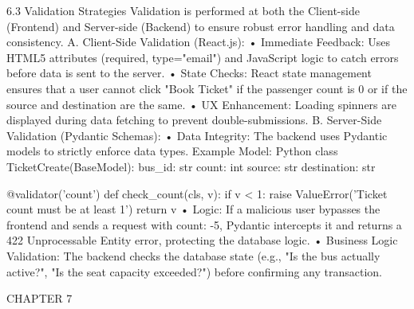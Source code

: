 6.3 Validation Strategies
Validation is performed at both the Client-side (Frontend) and Server-side (Backend) to ensure robust error handling and data consistency.
A. Client-Side Validation (React.js):
•	Immediate Feedback: Uses HTML5 attributes (required, type="email") and JavaScript logic to catch errors before data is sent to the server.
•	State Checks: React state management ensures that a user cannot click "Book Ticket" if the passenger count is 0 or if the source and destination are the same.
•	UX Enhancement: Loading spinners are displayed during data fetching to prevent double-submissions.
B. Server-Side Validation (Pydantic Schemas):
•	Data Integrity: The backend uses Pydantic models to strictly enforce data types.
Example Model:
Python
class TicketCreate(BaseModel):
    bus_id: str
    count: int
    source: str
    destination: str

    @validator('count')
    def check_count(cls, v):
        if v < 1:
            raise ValueError('Ticket count must be at least 1')
        return v
•	Logic: If a malicious user bypasses the frontend and sends a request with count: -5, Pydantic intercepts it and returns a 422 Unprocessable Entity error, protecting the database logic.
•	Business Logic Validation: The backend checks the database state (e.g., "Is the bus actually active?", "Is the seat capacity exceeded?") before confirming any transaction.























CHAPTER 7

